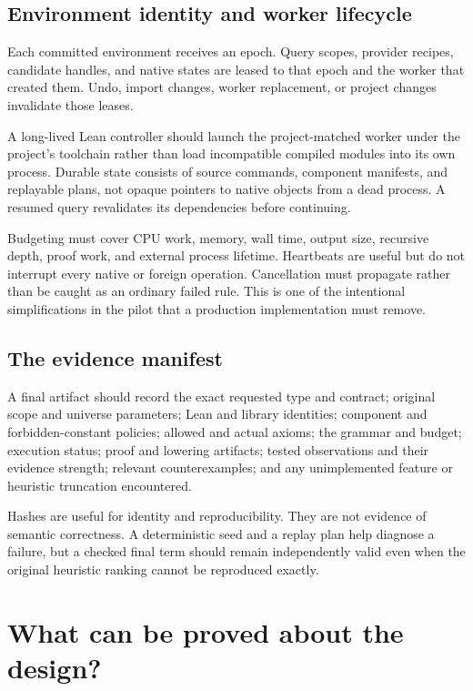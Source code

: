 \documentclass[11pt,a4paper]{article}
\theoremstyle{remark}
\begin{document}
\subsection{Environment identity and worker lifecycle}

Each committed environment receives an epoch. Query scopes, provider recipes, candidate handles, and native states are leased to that epoch and the worker that created them. Undo, import changes, worker replacement, or project changes invalidate those leases.

A long-lived Lean controller should launch the project-matched worker under the project's toolchain rather than load incompatible compiled modules into its own process. Durable state consists of source commands, component manifests, and replayable plans, not opaque pointers to native objects from a dead process. A resumed query revalidates its dependencies before continuing.

Budgeting must cover CPU work, memory, wall time, output size, recursive depth, proof work, and external process lifetime. Heartbeats are useful but do not interrupt every native or foreign operation. Cancellation must propagate rather than be caught as an ordinary failed rule. This is one of the intentional simplifications in the pilot that a production implementation must remove.

\subsection{The evidence manifest}

A final artifact should record the exact requested type and contract; original scope and universe parameters; Lean and library identities; component and forbidden-constant policies; allowed and actual axioms; the grammar and budget; execution status; proof and lowering artifacts; tested observations and their evidence strength; relevant counterexamples; and any unimplemented feature or heuristic truncation encountered.

Hashes are useful for identity and reproducibility. They are not evidence of semantic correctness. A deterministic seed and a replay plan help diagnose a failure, but a checked final term should remain independently valid even when the original heuristic ranking cannot be reproduced exactly.

\section{What can be proved about the design?}\label{sec:guarantees}
\end{document}
